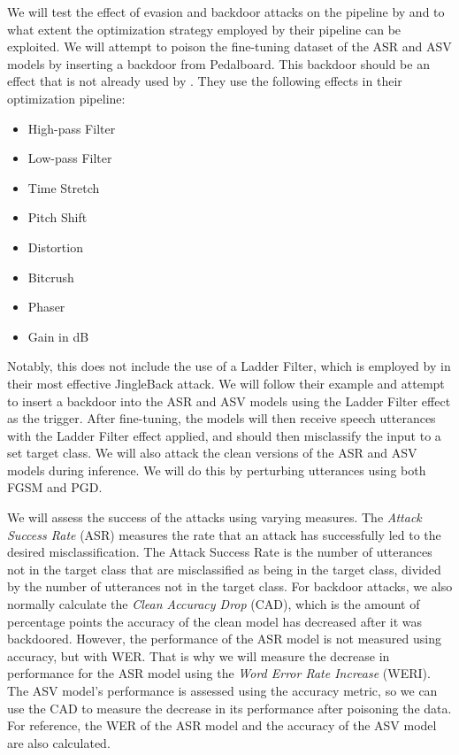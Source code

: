 \documentclass[11pt]{article}
\begin{document}
We will test the effect of evasion and backdoor attacks on the pipeline by \citeauthor{roddeman2024anonymization} and to what extent the optimization strategy employed by their pipeline can be exploited.
We will attempt to poison the fine-tuning dataset of the ASR and ASV models by inserting a backdoor from Pedalboard.
This backdoor should be an effect that is not already used by \citeauthor{roddeman2024anonymization}.
They use the following effects in their optimization pipeline:
\begin{itemize}
  \item High-pass Filter
  \item Low-pass Filter
  \item Time Stretch
  \item Pitch Shift
  \item Distortion
  \item Bitcrush
  \item Phaser
  \item Gain in dB
\end{itemize}
Notably, this does not include the use of a Ladder Filter, which is employed by \citet{stefanos2023jingleback} in their most effective JingleBack attack.
We will follow their example and attempt to insert a backdoor into the ASR and ASV models using the Ladder Filter effect as the trigger.
After fine-tuning, the models will then receive speech utterances with the Ladder Filter effect applied, and should then misclassify the input to a set target class.
We will also attack the clean versions of the ASR and ASV models during inference.
We will do this by perturbing utterances using both FGSM and PGD.

We will assess the success of the attacks using varying measures.
The \textit{Attack Success Rate} (ASR) measures the rate that an attack has successfully led to the desired misclassification.
The Attack Success Rate is the number of utterances not in the target class that are misclassified as being in the target class, divided by the number of utterances not in the target class.
For backdoor attacks, we also normally calculate the \textit{Clean Accuracy Drop} (CAD), which is the amount of percentage points the accuracy of the clean model has decreased after it was backdoored.
However, the performance of the ASR model is not measured using accuracy, but with WER.
That is why we will measure the decrease in performance for the ASR model using the \textit{Word Error Rate Increase} (WERI).
The ASV model's performance is assessed using the accuracy metric, so we can use the CAD to measure the decrease in its performance after poisoning the data.
For reference, the WER of the ASR model and the accuracy of the ASV model are also calculated.
\end{document}
